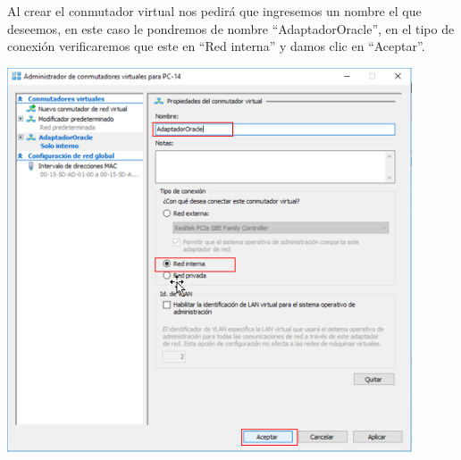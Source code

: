 Al crear el conmutador virtual nos pedirá que ingresemos un nombre el que deseemos, en este caso le pondremos de nombre “AdaptadorOracle”, en el tipo de conexión verificaremos que este en “Red interna” y damos clic en “Aceptar”. 
	\begin{center}
		\includegraphics[width=12cm]{./Imagenes/13} 
	\end{center} 
 
 

